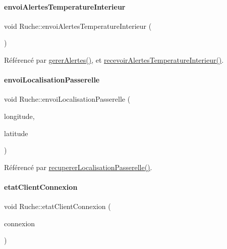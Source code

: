 \paragraph{\texorpdfstring{envoi\+Alertes\+Temperature\+Interieur}{envoiAlertesTemperatureInterieur}}
{\footnotesize\ttfamily void Ruche\+::envoi\+Alertes\+Temperature\+Interieur (\begin{DoxyParamCaption}\item[{\hyperlink{parametres_8h_aaa6de8207c94675264c90b10b613368d}{Seuils\+Alertes}}]{ }\end{DoxyParamCaption})\hspace{0.3cm}{\ttfamily [signal]}}



Référencé par \hyperlink{class_ruche_a80f3538f081aea887d7199f114dfca01}{gerer\+Alertes()}, et \hyperlink{class_ruche_a2984c1e492d1ceacd3081e39a4f8cc26}{recevoir\+Alertes\+Temperature\+Interieur()}.

\mbox{\label{class_ruche_a2a0f122bfd939419f40facf41e91fe30}} 
\paragraph{\texorpdfstring{envoi\+Localisation\+Passerelle}{envoiLocalisationPasserelle}}
{\footnotesize\ttfamily void Ruche\+::envoi\+Localisation\+Passerelle (\begin{DoxyParamCaption}\item[{Q\+String}]{longitude,  }\item[{Q\+String}]{latitude }\end{DoxyParamCaption})\hspace{0.3cm}{\ttfamily [signal]}}



Référencé par \hyperlink{class_ruche_abdb0503e660631a0a9d2ed7177918341}{recuperer\+Localisation\+Passerelle()}.

\mbox{\label{class_ruche_a932b2c69dbe919afed9549d5666b2736}} 
\paragraph{\texorpdfstring{etat\+Client\+Connexion}{etatClientConnexion}}
{\footnotesize\ttfamily void Ruche\+::etat\+Client\+Connexion (\begin{DoxyParamCaption}\item[{bool}]{connexion }\end{DoxyParamCaption})\hspace{0.3cm}{\ttfamily [signal]}}



